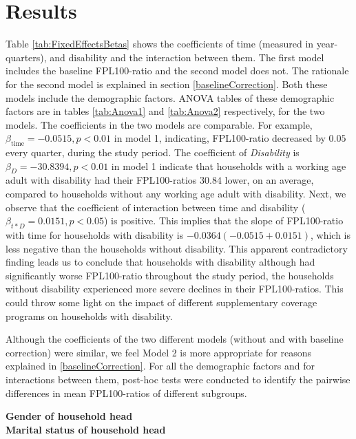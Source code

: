 \documentclass[11pt]{extarticle} %
\begin{document}
\section{Results}
Table \ref{tab:FixedEffectsBetas} shows the coefficients of time (measured in year-quarters), and disability and the interaction between them. The first model includes the baseline FPL100-ratio and the second model does not. The rationale for the second model is explained in section \ref{baselineCorrection}. Both these models include the demographic factors. ANOVA tables of these demographic factors are in tables \ref{tab:Anova1} and \ref{tab:Anova2} respectively, for the two models. The coefficients in the two models are comparable. For example, $\beta_{\text{time}} = -0.0515, p < 0.01$ in model 1, indicating, FPL100-ratio decreased by $0.05$ every quarter, during the study period. The coefficient of {\emph{Disability}} is $\beta_D = -30.8394, p < 0.01$ in model 1 indicate that households with a working age adult with disability had their FPL100-ratios $30.84$ lower, on an average, compared to households without any working age adult with disability. Next, we observe that the coefficient of interaction between time and disability ($\beta_{t*D} = 0.0151, p < 0.05$) is positive. This implies that the slope of FPL100-ratio with time for households with disability is $-0.0364 (-0.0515 + 0.0151)$, which is less negative than the households without disability. This apparent contradictory finding leads us to conclude that households with disability although had significantly worse FPL100-ratio throughout the study period, the households without disability experienced more severe declines in their FPL100-ratios. This could throw some light on the impact of different supplementary coverage programs on households with disability. 

Although the coefficients of the two different models (without and with baseline correction) were similar, we feel Model 2 is more appropriate for reasons explained in \ref{baselineCorrection}. For all the demographic factors and for interactions between them, post-hoc tests were conducted to identify the pairwise differences in mean FPL100-ratios of different subgroups. 

\noindent
{\bf{Gender of household head}} \\

\noindent
{\bf{Marital status of household head}} \\
\end{document}
